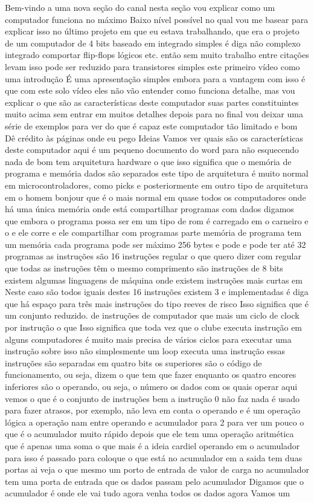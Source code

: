 \documentclass[oneside,11pt]{memoir} %
\begin{document}
Bem-vindo a uma nova seção do  canal nesta seção vou explicar  como um computador funciona no máximo  Baixo nível possível no qual vou me basear  para explicar isso no último projeto  em que eu estava trabalhando, que era o  projeto de um computador de 4 bits  baseado em integrado simples é  diga não complexo integrado  comportar flip-flops lógicos etc.  então sem muito trabalho entre  citações levam isso pode ser reduzido para  transistores simples  este primeiro vídeo como uma introdução  É uma apresentação simples embora para  a vantagem com isso é que com este solo  vídeo eles não vão entender como funciona  detalhe, mas vou explicar o que são  as características deste computador  suas partes constituintes muito acima  sem entrar em muitos detalhes depois para  no final vou deixar uma série de  exemplos para ver do que é capaz  este computador tão limitado e bom  Dê crédito às páginas onde eu pego  Ideias  Vamos ver quais são os  características deste computador aqui  é um pequeno documento do word para não  esquecendo nada de bom tem arquitetura  hardware o que isso significa que o  memória de programa e memória  dados são separados este tipo de  arquitetura é muito normal em  microcontroladores, como picks e  posteriormente em outro tipo de arquitetura em  o homem bonjour que é o mais normal em  quase todos os computadores onde há  uma única memória onde está  compartilhar programas com dados  digamos que embora o programa possa ser  em um tipo de rom é carregado em  o carneiro e o e ele corre e ele  compartilhar com programas parte  memória de programa tem um  memória cada programa pode ser  máximo 256 bytes e pode e pode ter  até 32 programas  as instruções são 16 instruções  regular o que quero dizer com regular  que todas as instruções têm o  mesmo comprimento são instruções de 8 bits  existem algumas linguagens de máquina onde existem  instruções mais curtas em  Neste caso são todos iguais destes 16  instruções existem 3 e implementadas é  diga que há espaço para três  mais instruções do tipo reeves de risco  Isso significa que é um conjunto reduzido.  de instruções de computador que mais  um ciclo de clock por instrução o que  Isso significa que toda vez que o  clube executa instrução em alguns  computadores é muito mais  precisa de vários ciclos para executar  uma instrução sobre isso não simplesmente  um loop executa uma instrução  essas instruções são separadas em  quatro bits os superiores são o código  de funcionamento, ou seja, dizem o que  tem que fazer enquanto os quatro  encores inferiores são o operando, ou seja,  o número os dados com os quais  operar aqui vemos o que é o conjunto de  instruções  bem a instrução 0 não faz nada  é usado para fazer atrasos, por exemplo, não  leva em conta o operando e é um  operação lógica a operação nam entre  operando e acumulador para 2 para ver um  pouco o que é o acumulador muito  rápido depois que ele tem uma operação  aritmética que é apenas uma soma  o que mais é a ideia cardiel operando em  o acumulador para isso é passado para  coloque o que está no acumulador em  a saida tem duas portas ai veja o que  mesmo  um porto de entrada de valor de carga  no acumulador tem uma porta de  entrada que os dados passam pelo acumulador  Digamos que o acumulador é onde ele vai  tudo agora venha todos os dados agora  Vamos um 
\end{document}
